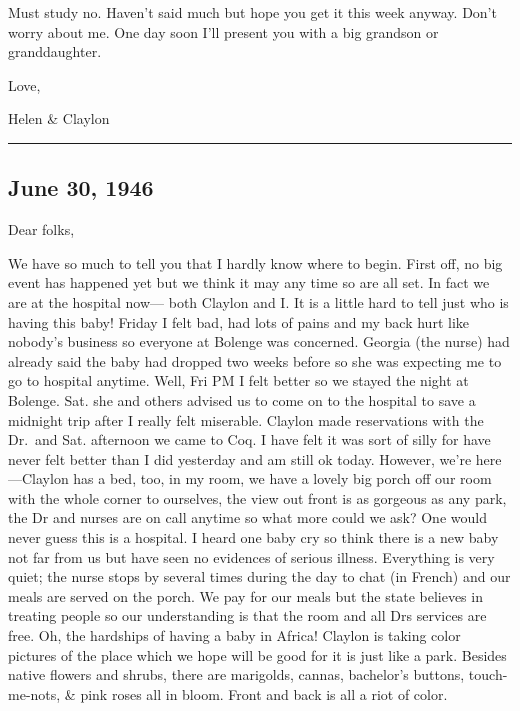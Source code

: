 \documentclass[
]{book}
\begin{document}
Must study no. Haven't said much but hope you get it this week anyway. Don't worry about me. One day soon I'll present you with a big grandson or granddaughter.

Love,

Helen \& Claylon

\begin{center}\rule{0.5\linewidth}{0.5pt}\end{center}

\hypertarget{june-30-1946}{%
\subsection{June 30, 1946}\label{june-30-1946}}

Dear folks,

We have so much to tell you that I hardly know where to begin. First off, no big event has happened yet but we think it may any time so are all set. In fact we are at the hospital now--- both Claylon and I. It is a little hard to tell just who is having this baby! Friday I felt bad, had lots of pains and my back hurt like nobody's business so everyone at Bolenge was concerned. Georgia (the nurse) had already said the baby had dropped two weeks before so she was expecting me to go to hospital anytime. Well, Fri PM I felt better so we stayed the night at Bolenge. Sat. she and others advised us to come on to the hospital to save a midnight trip after I really felt miserable. Claylon made reservations with the Dr.~and Sat. afternoon we came to Coq. I have felt it was sort of silly for have never felt better than I did yesterday and am still ok today. However, we're here---Claylon has a bed, too, in my room, we have a lovely big porch off our room with the whole corner to ourselves, the view out front is as gorgeous as any park, the Dr and nurses are on call anytime so what more could we ask? One would never guess this is a hospital. I heard one baby cry so think there is a new baby not far from us but have seen no evidences of serious illness. Everything is very quiet; the nurse stops by several times during the day to chat (in French) and our meals are served on the porch. We pay for our meals but the state believes in treating people so our understanding is that the room and all Drs services are free. Oh, the hardships of having a baby in Africa! Claylon is taking color pictures of the place which we hope will be good for it is just like a park. Besides native flowers and shrubs, there are marigolds, cannas, bachelor's buttons, touch-me-nots, \& pink roses all in bloom. Front and back is all a riot of color.
\end{document}
